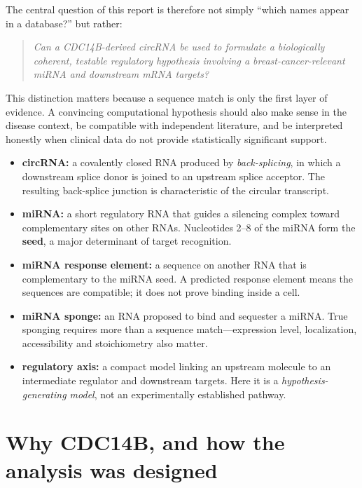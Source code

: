 \documentclass[11pt]{article}
\begin{document}
The central question of this report is therefore not simply ``which names appear in a database?'' but rather:

\begin{quote}
\emph{Can a CDC14B-derived circRNA be used to formulate a biologically coherent, testable regulatory hypothesis involving a breast-cancer-relevant miRNA and downstream mRNA targets?}
\end{quote}

This distinction matters because a sequence match is only the first layer of evidence. A convincing computational hypothesis should also make sense in the disease context, be compatible with independent literature, and be interpreted honestly when clinical data do not provide statistically significant support.

\begin{tcolorbox}[colback=softgray,colframe=gray!65,boxrule=0.5pt,arc=2mm,title=Key terms used in the analysis]
\small
\begin{itemize}
    \item \textbf{circRNA:} a covalently closed RNA produced by \emph{back-splicing}, in which a downstream splice donor is joined to an upstream splice acceptor. The resulting back-splice junction is characteristic of the circular transcript.
    \item \textbf{miRNA:} a short regulatory RNA that guides a silencing complex toward complementary sites on other RNAs. Nucleotides 2--8 of the miRNA form the \textbf{seed}, a major determinant of target recognition.
    \item \textbf{miRNA response element:} a sequence on another RNA that is complementary to the miRNA seed. A predicted response element means the sequences are compatible; it does not prove binding inside a cell.
    \item \textbf{miRNA sponge:} an RNA proposed to bind and sequester a miRNA. True sponging requires more than a sequence match---expression level, localization, accessibility and stoichiometry also matter.
    \item \textbf{regulatory axis:} a compact model linking an upstream molecule to an intermediate regulator and downstream targets. Here it is a \emph{hypothesis-generating model}, not an experimentally established pathway.
\end{itemize}
\end{tcolorbox}

\section{Why CDC14B, and how the analysis was designed}
\end{document}
